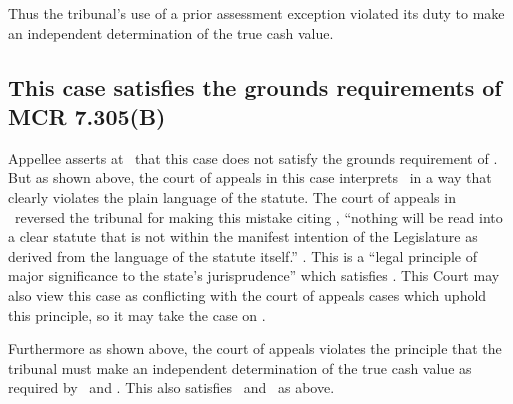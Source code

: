 \documentclass[12pt,\documentclassflag]{michiganCourtOfAppealsBrief}
\begin{document}
Thus the tribunal's use of a prior assessment exception violated its duty to make an independent determination of the true cash value.


\subsection{This case satisfies the grounds requirements of MCR 7.305(B)}

Appellee asserts at \ that this case does not satisfy the grounds requirement of \cite{MCR 7.305(B)}. But as shown above, the court of appeals in this case interprets \mathieuGast\ in a way that clearly violates the plain language of the statute. The court of appeals in \cite{Patru I}\ reversed the tribunal for making this mistake citing , ``nothing will be read into a clear statute that is not within the manifest intention of the Legislature as derived from the language of the statute itself.'' . This is a ``legal principle of major significance to the state's jurisprudence'' which satisfies \cite{MCR 7.305(B)(3)}. %
This Court may also view this case as conflicting with the  court of appeals cases which uphold this principle, so it may take the case on \cite{MCR 7.305(B)(5)(b)}.

Furthermore as shown above, the court of appeals violates the principle that the tribunal must make an independent determination of the true cash value as required by \cite{Jones & Laughlin}\ and \cite{Great Lakes Div of Nat'l Steel Corp}.
This also satisfies
\cite{MCR 7.305(B)(3)}\ 
and \cite{MCR 7.305(B)(5)(b)}\ as above.
\end{document}
